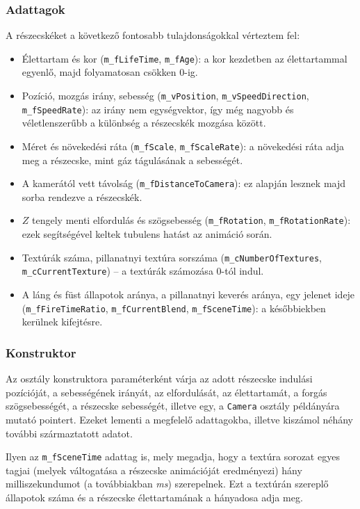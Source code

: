 \subsubsection{Adattagok}
A részecskéket a következő fontosabb tulajdonságokkal vérteztem fel:
\begin{itemize}
\item Élettartam és kor (\texttt{m\_fLifeTime}, \texttt{m\_fAge}): a kor kezdetben az élettartammal egyenlő, majd folyamatosan csökken $0$-ig.
\item Pozíció, mozgás irány, sebesség (\texttt{m\_vPosition}, \texttt{m\_vSpeedDirection}, \texttt{m\_fSpeedRate}): az irány nem egységvektor, így még nagyobb és véletlenszerűbb a különbség a részecskék mozgása között.
\item Méret és növekedési ráta (\texttt{m\_fScale}, \texttt{m\_fScaleRate}): a növekedési ráta adja meg a részecske, mint gáz tágulásának a sebességét.
\item A kamerától vett távolság (\texttt{m\_fDistanceToCamera}): ez alapján lesznek majd sorba rendezve a részecskék.
\item $Z$ tengely menti elfordulás és szögsebesség (\texttt{m\_fRotation}, \texttt{m\_fRotationRate}): ezek segítségével keltek tubulens hatást az animáció során.
\item Textúrák száma, pillanatnyi textúra sorszáma (\texttt{m\_cNumberOfTextures}, \texttt{m\_cCurrentTexture}) -- a textúrák számozása $0$-tól indul.
\item A láng és füst állapotok aránya, a pillanatnyi keverés aránya, egy jelenet ideje (\texttt{m\_fFireTimeRatio}, \texttt{m\_fCurrentBlend}, \texttt{m\_fSceneTime}): a későbbiekben kerülnek kifejtésre.
\end{itemize}

\subsubsection{Konstruktor}
Az osztály konstruktora paraméterként várja az adott részecske indulási pozícióját, a sebességének irányát, az elfordulását, az élettartamát, a forgás szögsebességét, a részecske sebességét, illetve egy, a \texttt{Camera} osztály példányára mutató pointert. Ezeket lementi a megfelelő adattagokba, illetve kiszámol néhány további származtatott adatot. 

Ilyen az \texttt{m\_fSceneTime} adattag is, mely megadja, hogy a textúra sorozat egyes tagjai (melyek váltogatása a részecske animációját eredményezi) hány milliszekundumot (a továbbiakban \textit{ms}) szerepelnek. Ezt a textúrán szereplő állapotok száma és a részecske élettartamának a hányadosa adja meg. 

